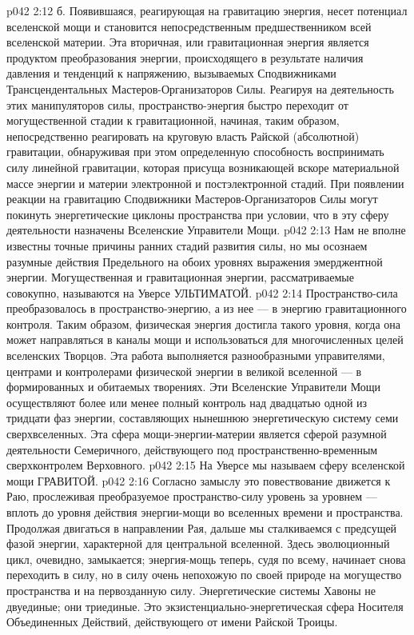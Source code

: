 \vs p042 2:12 \pc б.  Появившаяся, реагирующая на гравитацию энергия, несет потенциал вселенской мощи и становится непосредственным предшественником всей вселенской материи. Эта вторичная, или гравитационная энергия является продуктом преобразования энергии, происходящего в результате наличия давления и тенденций к напряжению, вызываемых Сподвижниками Трансцендентальных Мастеров\hyp{}Организаторов Силы. Реагируя на деятельность этих манипуляторов силы, пространство\hyp{}энергия быстро переходит от могущественной стадии к гравитационной, начиная, таким образом, непосредственно реагировать на круговую власть Райской (абсолютной) гравитации, обнаруживая при этом определенную способность воспринимать силу линейной гравитации, которая присуща возникающей вскоре материальной массе энергии и материи электронной и постэлектронной стадий. При появлении реакции на гравитацию Сподвижники Мастеров\hyp{}Организаторов Силы могут покинуть энергетические циклоны пространства при условии, что в эту сферу деятельности назначены Вселенские Управители Мощи.
\vs p042 2:13 \pc Нам не вполне известны точные причины ранних стадий развития силы, но мы осознаем разумные действия Предельного на обоих уровнях выражения эмерджентной энергии. Могущественная и гравитационная энергии, рассматриваемые совокупно, называются на Уверсе УЛЬТИМАТОЙ.
\vs p042 2:14 \bibnobreakspace {} Пространство\hyp{}сила преобразовалось в пространство\hyp{}энергию, а из нее --- в энергию гравитационного контроля. Таким образом, физическая энергия достигла такого уровня, когда она может направляться в каналы мощи и использоваться для многочисленных целей вселенских Творцов. Эта работа выполняется разнообразными управителями, центрами и контролерами физической энергии в великой вселенной --- в формированных и обитаемых творениях. Эти Вселенские Управители Мощи осуществляют более или менее полный контроль над двадцатью одной из тридцати фаз энергии, составляющих нынешнюю энергетическую систему семи сверхвселенных. Эта сфера мощи\hyp{}энергии\hyp{}материи является сферой разумной деятельности Семеричного, действующего под пространственно\hyp{}временным сверхконтролем Верховного.
\vs p042 2:15 На Уверсе мы называем сферу вселенской мощи ГРАВИТОЙ.
\vs p042 2:16 \bibnobreakspace {} Согласно замыслу это повествование движется к Раю, прослеживая преобразуемое пространство\hyp{}силу уровень за уровнем --- вплоть до уровня действия энергии\hyp{}мощи во вселенных времени и пространства. Продолжая двигаться в направлении Рая, дальше мы сталкиваемся с предсущей фазой энергии, характерной для центральной вселенной. Здесь эволюционный цикл, очевидно, замыкается; энергия\hyp{}мощь теперь, судя по всему, начинает снова переходить в силу, но в силу очень непохожую по своей природе на могущество пространства и на первозданную силу. Энергетические системы Хавоны не двуединые; они триединые. Это экзистенциально\hyp{}энергетическая сфера Носителя Объединенных Действий, действующего от имени Райской Троицы.

